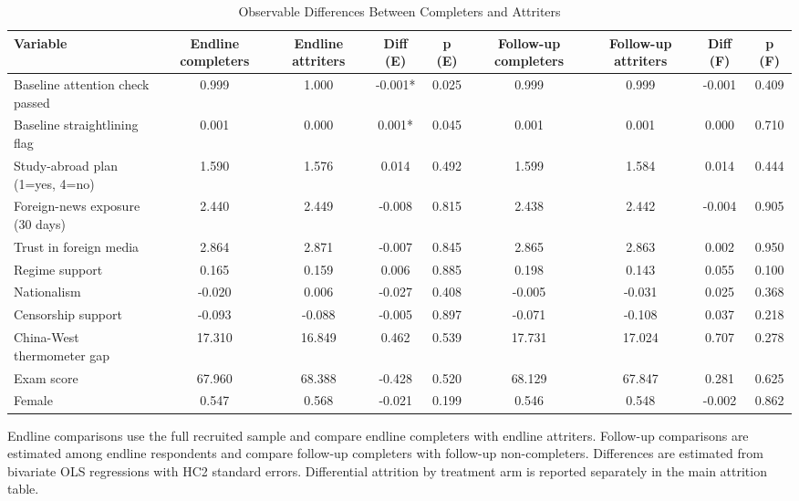 \begin{table}[H]
\centering
\caption{Observable Differences Between Completers and Attriters}
\label{tab:attrition_composition}
\footnotesize
\begin{threeparttable}
\begin{tabular}{lcccccccc}
\toprule
Variable & Endline completers & Endline attriters & Diff (E) & p (E) & Follow-up completers & Follow-up attriters & Diff (F) & p (F) \\
\midrule
Baseline attention check passed & 0.999 & 1.000 & -0.001* & 0.025 & 0.999 & 0.999 & -0.001 & 0.409 \\
Baseline straightlining flag & 0.001 & 0.000 & 0.001* & 0.045 & 0.001 & 0.001 & 0.000 & 0.710 \\
Study-abroad plan (1=yes, 4=no) & 1.590 & 1.576 & 0.014 & 0.492 & 1.599 & 1.584 & 0.014 & 0.444 \\
Foreign-news exposure (30 days) & 2.440 & 2.449 & -0.008 & 0.815 & 2.438 & 2.442 & -0.004 & 0.905 \\
Trust in foreign media & 2.864 & 2.871 & -0.007 & 0.845 & 2.865 & 2.863 & 0.002 & 0.950 \\
Regime support & 0.165 & 0.159 & 0.006 & 0.885 & 0.198 & 0.143 & 0.055 & 0.100 \\
Nationalism & -0.020 & 0.006 & -0.027 & 0.408 & -0.005 & -0.031 & 0.025 & 0.368 \\
Censorship support & -0.093 & -0.088 & -0.005 & 0.897 & -0.071 & -0.108 & 0.037 & 0.218 \\
China-West thermometer gap & 17.310 & 16.849 & 0.462 & 0.539 & 17.731 & 17.024 & 0.707 & 0.278 \\
Exam score & 67.960 & 68.388 & -0.428 & 0.520 & 68.129 & 67.847 & 0.281 & 0.625 \\
Female & 0.547 & 0.568 & -0.021 & 0.199 & 0.546 & 0.548 & -0.002 & 0.862 \\
\bottomrule
\end{tabular}
\begin{tablenotes}[flushleft]
\footnotesize
\item Endline comparisons use the full recruited sample and compare endline completers with endline attriters. Follow-up comparisons are estimated among endline respondents and compare follow-up completers with follow-up non-completers. Differences are estimated from bivariate OLS regressions with HC2 standard errors. Differential attrition by treatment arm is reported separately in the main attrition table.
\end{tablenotes}
\end{threeparttable}
\end{table}
